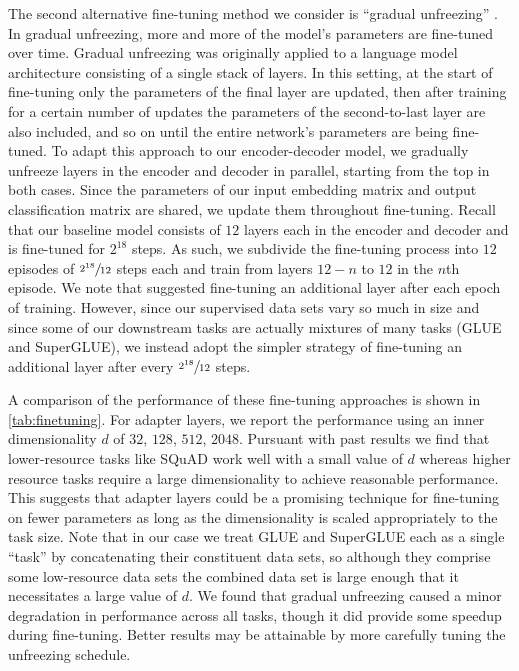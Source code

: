 \documentclass[twoside,11pt]{article}
\begin{document}
The second alternative fine-tuning method we consider is ``gradual unfreezing'' \citep{howard2018universal}.
In gradual unfreezing, more and more of the model's parameters are fine-tuned over time.
Gradual unfreezing was originally applied to a language model architecture consisting of a single stack of layers.
In this setting, at the start of fine-tuning only the parameters of the final layer are updated, then after training for a certain number of updates the parameters of the second-to-last layer are also included, and so on until the entire network's parameters are being fine-tuned.
To adapt this approach to our encoder-decoder model, we gradually unfreeze layers in the encoder and decoder in parallel, starting from the top in both cases.
Since the parameters of our input embedding matrix and output classification matrix are shared, we update them throughout fine-tuning.
Recall that our baseline model consists of $12$ layers each in the encoder and decoder and is fine-tuned for $2^{18}$ steps.
As such, we subdivide the fine-tuning process into $12$ episodes of $\sfrac{2^{18}}{12}$ steps each and train from layers $12 - n$ to $12$ in the $n$th episode.
We note that \cite{howard2018universal} suggested fine-tuning an additional layer after each epoch of training.
However, since our supervised data sets vary so much in size and since some of our downstream tasks are actually mixtures of many tasks (GLUE and SuperGLUE), we instead adopt the simpler strategy of fine-tuning an additional layer after every $\sfrac{2^{18}}{12}$ steps.

A comparison of the performance of these fine-tuning approaches is shown in \cref{tab:finetuning}.
For adapter layers, we report the performance using an inner dimensionality $d$ of $32$, $128$, $512$, $2048$.
Pursuant with past results \citep{houlsby2019parameter,bapna2019simple} we find that lower-resource tasks like SQuAD work well with a small value of $d$ whereas higher resource tasks require a large dimensionality to achieve reasonable performance.
This suggests that adapter layers could be a promising technique for fine-tuning on fewer parameters as long as the dimensionality is scaled appropriately to the task size.
Note that in our case we treat GLUE and SuperGLUE each as a single ``task'' by concatenating their constituent data sets, so although they comprise some low-resource data sets the combined data set is large enough that it necessitates a large value of $d$.
We found that gradual unfreezing caused a minor degradation in performance across all tasks, though it did provide some speedup during fine-tuning.
Better results may be attainable by more carefully tuning the unfreezing schedule.
\end{document}
